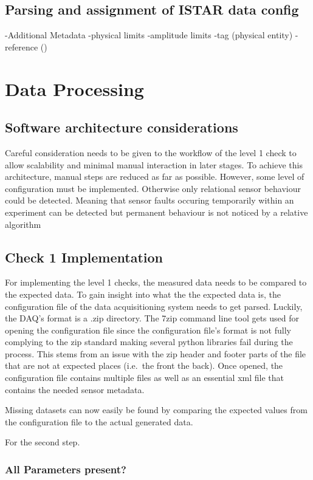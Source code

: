 \subsection{Parsing and assignment of ISTAR data config}
-Additional Metadata
-physical limits
-amplitude limits
-tag (physical entity)
-reference ()


\section{Data Processing}

\subsection{Software architecture considerations}

Careful consideration needs to be given to the workflow of the level 1 check to allow scalability and minimal manual interaction in later stages. To achieve this architecture, manual steps are reduced as far as possible. However, some level of configuration must be implemented. Otherwise only relational sensor behaviour could be detected. Meaning that sensor faults occuring temporarily within an experiment can be detected but permanent behaviour is not noticed by a relative algorithm

\subsection{Check 1 Implementation}
For implementing the level 1 checks, the measured data needs to be compared to the expected data. To gain insight into what the the expected data is, the configuration file of the data acquisitioning system needs to get parsed.
Luckily, the DAQ's format is a .zip directory.
The 7zip command line tool gets used for opening the configuration file since the configuration file's format is not fully complying to the zip standard making several python libraries fail during the process. This stems from an issue with the zip header and footer parts of the file that are not at expected places (i.e.\ the front the back).
Once opened, the configuration file contains multiple files as well as an essential xml file that contains the needed sensor metadata.

Missing datasets can now easily be found by comparing the expected values from the configuration file to the actual generated data.

For the second step.

\subsubsection{All Parameters present?}

